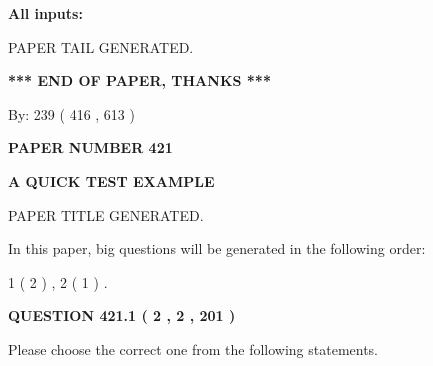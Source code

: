 \documentclass[12pt]{article}
\begin{document}
   
   
   
\noindent{}
   
   
   
   
\noindent\vspace{0.1in}\hspace{-0.08in} {\textbf{\Large{All inputs: }}}
   
   
   
   
   
   
 \vspace{0.2in}
 
   
   
\vspace{2.0in} PAPER TAIL GENERATED.
   
   
   
   
\vspace{1.0in} 
{\textbf{\large{ *** END OF PAPER, THANKS *** }}} 
   
   
\hspace{1.0in} By: 
 239 ( 416 ,  613 )
   
   
   
   
\newpage 
\setcounter{page}{ 
   421001 } 
   
   
   
   
 {\textbf{ \Large{ PAPER NUMBER  421  }}}
   
   
\vspace{0.2in}
   
   
   
   
   
   
   
   
 \vspace{0.2in}
{\LARGE {\textbf{ A QUICK TEST EXAMPLE}}}
   
   
 PAPER TITLE GENERATED.
   
   
   
\vspace{0.2in}
   
In this paper, big questions will be generated in the following order: 
   
   
   1 ( 2 )
 ,
   2 ( 1 )
 .
  
\vspace{0.2in}
  
{\textbf{\Large{QUESTION
421.1 
 ( 2 , 2 , 201 )
}}}
  
  
Please choose the correct one from the following statements.
 
\end{document}
